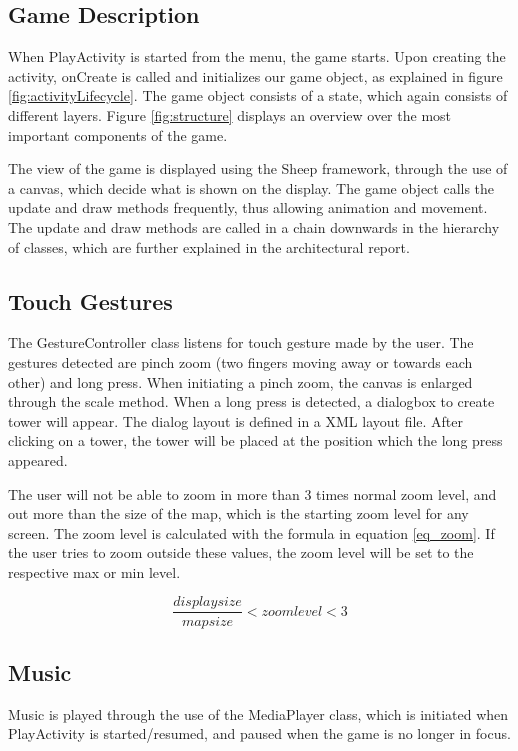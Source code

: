 \subsection{Game Description}
When PlayActivity is started from the menu, the game starts. Upon creating the activity, onCreate is called and initializes our game object, as explained in figure \ref{fig:activityLifecycle}. The game object consists of a state, which again consists of different layers. Figure \ref{fig:structure} displays an overview over the most important components of the game. 

The view of the game is displayed using the Sheep framework, through the use of a canvas, which decide what is shown on the display. The game object calls the update and draw methods frequently, thus allowing animation and movement. The update and draw methods are called in a chain downwards in the hierarchy of classes, which are further explained in the architectural report.\cite{arcReport}

\subsection{Touch Gestures}
The GestureController class listens for touch gesture made by the user. The gestures detected are pinch zoom (two fingers moving away or towards each other) and long press. When initiating a pinch zoom, the canvas is enlarged through the scale method. When a long press is detected, a dialogbox to create tower will appear. The dialog layout is defined in a XML layout file. After clicking on a tower, the tower will be placed at the position which the long press appeared.

The user will not be able to zoom in more than 3 times normal zoom level, and out more than the size of the map, which is the starting zoom level for any screen. The zoom level is calculated with the formula in equation \ref{eq_zoom}. If the user tries to zoom outside these values, the zoom level will be set to the respective max or min level.


\begin{equation}\label{eq_zoom}
	\frac{displaysize}{mapsize} < zoom level < 3
\end{equation}

\subsection{Music}
Music is played through the use of the MediaPlayer class, which is initiated when PlayActivity is started/resumed, and paused when the game is no longer in focus.

